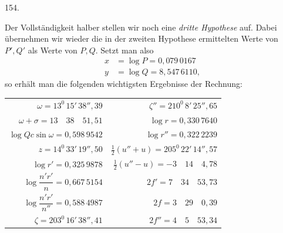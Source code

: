\par{}\medskip
\hypertarget{native-208-article154}{}
\begin{center}154.\end{center}
Der Vollständigkeit halber stellen wir noch eine \textit{dritte Hypothese} auf. Dabei übernehmen wir wieder die in der zweiten Hypothese ermittelten Werte von $P',Q'$ als Werte von $P,Q$. Setzt man also
\[
\begin{aligned}
x&=\log P=0{,}079\,0167\\
y&=\log Q=8{,}547\,6110,
\end{aligned}
\]
so erhält man die folgenden wichtigsten Ergebnisse der Rechnung:
\begin{center}\small\setlength{\tabcolsep}{6pt}
\begin{tabular}{@{}r|r@{}}
$\omega=13^{0}\,15'\,38''{,}39$ & $\zeta''=210^{0}\,8'\,25''{,}65$\\[.5em]
$\omega+\sigma=13\quad38\quad51{,}51$ & $\log r=0{,}330\,7640$\\[.5em]
$\log Qc\sin\omega=0{,}598\,9542$ & $\log r''=0{,}322\,2239$\\[.5em]
$z=14^{0}\,33'\,19''{,}50$ & $\tfrac12(u''+u)=205^{0}\,22'\,14''{,}57$\\[.5em]
$\log r'=0{,}325\,9878$ & $\tfrac12(u''-u)=-3\quad14\quad4{,}78$\\[.5em]
$\log\dfrac{n'r'}{n}=0{,}667\,5154$ & $2f'=7\quad34\quad53{,}73$\\[.7em]
$\log\dfrac{n'r'}{n''}=0{,}588\,4987$ & $2f=3\quad29\quad0{,}39$\\[.7em]
$\zeta=203^{0}\,16'\,38''{,}41$ & $2f''=4\quad5\quad53{,}34$
\end{tabular}
\end{center}

